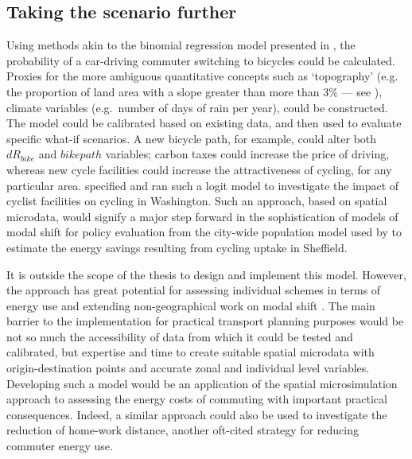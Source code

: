 \subsection{Taking the scenario further} \label{stfurther}
Using methods akin to the binomial regression model presented in %
\citet{Schoner2013}, the probability of a car-driving commuter switching to bicycles
could be calculated. Proxies for the more ambiguous quantitative concepts such as
`topography'
(e.g. the proportion of land area with a slope greater than more than 3\% ---
see \citep{Heinen2012}), climate variables (e.g.~number of days of rain per
year), could be constructed. The model could be calibrated based
on existing data, and then used to evaluate specific what-if scenarios.
A new bicycle path, for example, could alter both $dR_{bike}$ and $bikepath$
variables; carbon taxes could increase the price of driving, whereas new cycle
facilities could increase the attractiveness of cycling, for any particular area.
\citet{Buehler2012} specified and ran such a logit model to investigate the
impact of cyclist facilities on cycling in Washington.
Such an approach, based on
spatial microdata, would signify a major step forward
in the sophistication of models of modal shift for policy evaluation from the
city-wide population model used by \citet{Lovelace2011-assessing} to estimate the energy
savings resulting from cycling uptake in Sheffield.

It is outside the scope of the thesis to design and
implement this model. However, the approach has great potential for
assessing individual schemes in terms of energy use and extending
non-geographical work on modal shift \citep{Lovelace2011-assessing}. The main barrier
to the implementation for practical transport planning purposes
would be not so much the accessibility of data from which it could be tested
and calibrated, but expertise and time to create suitable spatial microdata
with origin-destination points and accurate zonal and individual level
variables. Developing such a model would be an application of the spatial
microsimulation approach to assessing the energy costs of commuting with
important practical consequences. Indeed, a similar approach could also be used
to investigate the reduction of home-work distance, another oft-cited strategy
for reducing commuter energy use.

